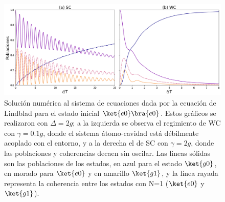 \begin{figure}[h]
    \centering
    \includegraphics[width=\textwidth]{figuras/ch3/poblaciones sc vs wc.png}
    \caption{Solución numérica al sistema de ecuaciones dada por la ecuación de Lindblad para el estado inicial $\ket{e0}\bra{e0}$. Estos gráficos se realizaron con $\Delta=2g$; a la izquierda se observa el regimiento de WC con $\gamma=0.1g$, donde el sistema átomo-cavidad está débilmente acoplado con el entorno, y a la derecha el de SC con $\gamma=2g$, donde las poblaciones y coherencias decaen sin oscilar. Las lineas sólidas son las poblaciones de los estados, en azul para el estado $\ket{g0}$, en morado para $\ket{e0}$ y en amarillo $\ket{g1}$, y la línea rayada representa la coherencia entre los estados con N=1 ($\ket{e0}$ y $\ket{g1}$). }
    \label{fig3:poblaciones e0}
\end{figure}

